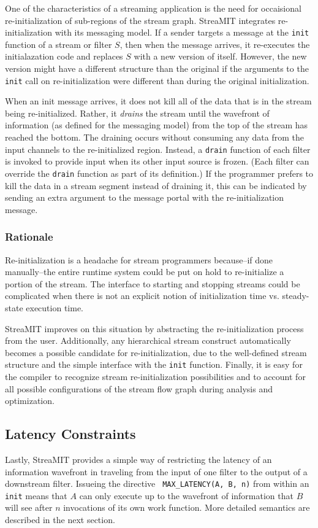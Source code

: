One of the characteristics of a streaming application is the need for
occaisional re-initialization of sub-regions of the stream graph.
StreaMIT integrates re-initialization with its messaging model.  If a
sender targets a message at the {\tt init} function of a stream or
filter $S$, then when the message arrives, it re-executes the
initialazation code and replaces $S$ with a new version of itself.
However, the new version might have a different structure than the
original if the arguments to the {\tt init} call on re-initialization
were different than during the original initialization.

When an init message arrives, it does not kill all of the data that is
in the stream being re-initialized.  Rather, it {\it drains} the
stream until the wavefront of information (as defined for the
messaging model) from the top of the stream has reached the bottom.
The draining occurs without consuming any data from the input channels
to the re-initialized region.  Instead, a {\tt drain} function of each
filter is invoked to provide input when its other input source is
frozen.  (Each filter can override the {\tt drain} function as part of
its definition.)  If the programmer prefers to kill the data in a
stream segment instead of draining it, this can be indicated by
sending an extra argument to the message portal with the
re-initialization message.

\subsubsection{Rationale}

Re-initialization is a headache for stream programmers because--if
done manually--the entire runtime system could be put on hold to
re-initialize a portion of the stream.  The interface to starting and
stopping streams could be complicated when there is not an explicit
notion of initialization time vs. steady-state execution time.

StreaMIT improves on this situation by abstracting the
re-initialization process from the user.  Additionally, any
hierarchical stream construct automatically becomes a possible
candidate for re-initialization, due to the well-defined stream
structure and the simple interface with the {\tt init} function.
Finally, it is easy for the compiler to recognize stream
re-initialization possibilities and to account for all possible
configurations of the stream flow graph during analysis and optimization.

\subsection{Latency Constraints}

Lastly, StreaMIT provides a simple way of restricting the latency of
an information wavefront in traveling from the input of one filter to
the output of a downstream filter.  Issueing the directive {\tt
MAX\_LATENCY(A, B, n)} from within an {\tt init} means that $A$ can
only execute up to the wavefront of information that $B$ will see
after $n$ invocations of its own work function.  More detailed
semantics are described in the next section.
